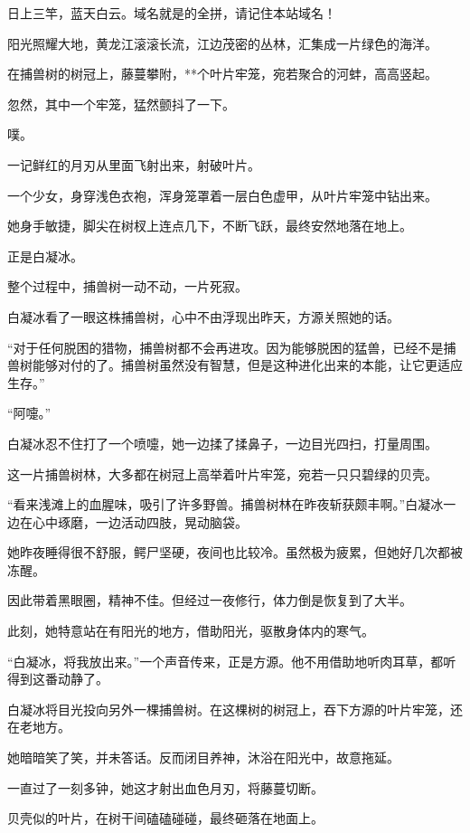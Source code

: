 
\begin{this_body}

日上三竿，蓝天白云。域名就是的全拼，请记住本站域名！

阳光照耀大地，黄龙江滚滚长流，江边茂密的丛林，汇集成一片绿色的海洋。

在捕兽树的树冠上，藤蔓攀附，**个叶片牢笼，宛若聚合的河蚌，高高竖起。

忽然，其中一个牢笼，猛然颤抖了一下。

噗。

一记鲜红的月刃从里面飞射出来，射破叶片。

一个少女，身穿浅色衣袍，浑身笼罩着一层白色虚甲，从叶片牢笼中钻出来。

她身手敏捷，脚尖在树杈上连点几下，不断飞跃，最终安然地落在地上。

正是白凝冰。

整个过程中，捕兽树一动不动，一片死寂。

白凝冰看了一眼这株捕兽树，心中不由浮现出昨天，方源关照她的话。

“对于任何脱困的猎物，捕兽树都不会再进攻。因为能够脱困的猛兽，已经不是捕兽树能够对付的了。捕兽树虽然没有智慧，但是这种进化出来的本能，让它更适应生存。”

“阿嚏。”

白凝冰忍不住打了一个喷嚏，她一边揉了揉鼻子，一边目光四扫，打量周围。

这一片捕兽树林，大多都在树冠上高举着叶片牢笼，宛若一只只碧绿的贝壳。

“看来浅滩上的血腥味，吸引了许多野兽。捕兽树林在昨夜斩获颇丰啊。”白凝冰一边在心中琢磨，一边活动四肢，晃动脑袋。

她昨夜睡得很不舒服，鳄尸坚硬，夜间也比较冷。虽然极为疲累，但她好几次都被冻醒。

因此带着黑眼圈，精神不佳。但经过一夜修行，体力倒是恢复到了大半。

此刻，她特意站在有阳光的地方，借助阳光，驱散身体内的寒气。

“白凝冰，将我放出来。”一个声音传来，正是方源。他不用借助地听肉耳草，都听得到这番动静了。

白凝冰将目光投向另外一棵捕兽树。在这棵树的树冠上，吞下方源的叶片牢笼，还在老地方。

她暗暗笑了笑，并未答话。反而闭目养神，沐浴在阳光中，故意拖延。

一直过了一刻多钟，她这才射出血色月刃，将藤蔓切断。

贝壳似的叶片，在树干间磕磕碰碰，最终砸落在地面上。


\end{this_body}
